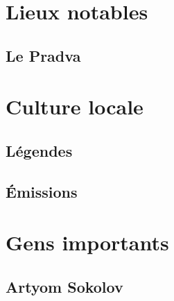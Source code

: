 \documentclass[10pt,a4paper]{book}
\begin{document}
\chapter{Lieux notables}
\section{Le Pradva}
\chapter{Culture locale}
\section{Légendes}
\section{Émissions}
\chapter{Gens importants}
\section{Artyom Sokolov}
\end{document}
